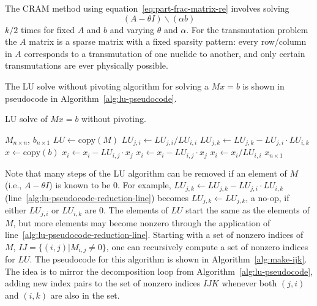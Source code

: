 The CRAM method using equation~\ref{eq:part-frac-matrix-re} involves solving
\begin{equation}
\label{eq:basic-matrix-solve}
 (A - \theta I)\backslash(\alpha b)
\end{equation}
$k/2$ times for fixed $A$ and $b$ and varying $\theta$ and $\alpha$. For the
transmutation problem the $A$ matrix is a sparse matrix with a fixed sparsity
pattern: every row/column in $A$ corresponds to a transmutation of one nuclide
to another, and only certain transmutations are ever physically possible.

The LU solve without pivoting algorithm for solving a $Mx=b$ is shown in
pseudocode in Algorithm~\ref{alg:lu-pseudocode}.
\begin{algorithm}
  \caption{LU solve of $Mx=b$ without pivoting.}\label{alg:lu-pseudocode}
  \begin{algorithmic}[1]
  \REQUIRE $M_{n\times n}$, $b_{n\times 1}$
  \STATE {}
  \STATE {}
  \STATE
  \STATE $LU \leftarrow \mathrm{copy}(M)$
  \STATE
          \STATE $LU_{j, i} \leftarrow LU_{j, i}/LU_{i, i}$\label{alg:lu-pseudocode-decompose-division}
              \STATE $LU_{j, k} \leftarrow LU_{j, k} - LU_{j, i}\cdot LU_{i, k}$\label{alg:lu-pseudocode-reduction-line}
          \ENDFOR
      \ENDFOR
  \ENDFOR
  \STATE
  \STATE {}
  \STATE $x \leftarrow \mathrm{copy}(b)$
  \STATE
  \STATE {}
          \STATE $x_i \leftarrow x_i - LU_{i, j}\cdot x_j$
      \ENDFOR
  \ENDFOR
  \STATE
  \STATE {}
          \STATE $x_i \leftarrow x_i -LU_{i, j}\cdot x_j$
      \ENDFOR
      \STATE $x_i \leftarrow x_i/LU_{i, i}$\label{alg:lu-pseudocode-solve-division}
  \ENDFOR
  \STATE
  \ENSURE $x_{n\times 1}$

\end{algorithmic}
\end{algorithm}

Note that many steps of the LU algorithm can be removed if an element of $M$
(i.e., $A - \theta I$) is known to be 0. For example,
$LU_{j, k} \leftarrow LU_{j, k} - LU_{j, i}\cdot LU_{i, k}$
(line~\ref{alg:lu-pseudocode-reduction-line}) becomes
$LU_{j, k} \leftarrow LU_{j, k}$, a no-op, if either $LU_{j, i}$ or
$LU_{i, k}$ are 0. The elements of $LU$ start the same as the elements of $M$,
but more elements may become nonzero through the application of
line~\ref{alg:lu-pseudocode-reduction-line}. Starting with a set of nonzero
indices of $M$, $IJ=\{(i, j) | M_{i, j} \neq 0\}$, one can recursively compute
a set of nonzero indices for $LU$. The pseudocode for this algorithm is shown
in Algorithm~\ref{alg:make-ijk}. The idea is to mirror the decomposition loop
from Algorithm~\ref{alg:lu-pseudocode}, adding new index pairs to the set of
nonzero indices $IJK$ whenever both $(j, i)$ and $(i, k)$ are also in the set.

